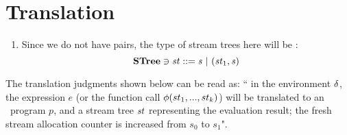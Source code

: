 \section{Translation}

\begin{enumerate}[(1)]
	\item Since we do not have pairs, the type of stream trees here will be : $$ \STree \ni \st ::= \s \ | \ (\st_1,\s) $$

%	

\end{enumerate}
	
The translation judgments shown below can be read as: `` in the environment $\delta$, the expression $e$ (or the function call $\phi(st_1,...,st_k)$) will be translated to an \fmsvcode \  program $p$, and a stream tree $\mathit{st}$ representing the evaluation result; the fresh stream allocation counter is increased from $s_0$ to $s_1$". 
	
